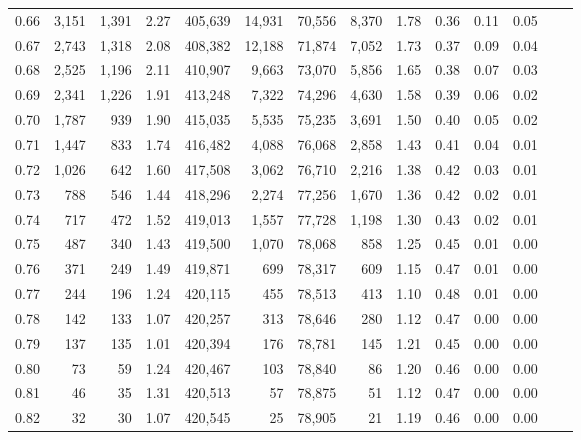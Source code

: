 \begin{tabular}{rrrrrrrrrrrrrr}
0.66 &   3,151 &  1,391 &    2.27 &  405,639 &   14,931 &  70,556 &   8,370 &  1.78 &  0.36 &  0.11 &      0.05 \\
0.67 &   2,743 &  1,318 &    2.08 &  408,382 &   12,188 &  71,874 &   7,052 &  1.73 &  0.37 &  0.09 &      0.04 \\
0.68 &   2,525 &  1,196 &    2.11 &  410,907 &    9,663 &  73,070 &   5,856 &  1.65 &  0.38 &  0.07 &      0.03 \\
0.69 &   2,341 &  1,226 &    1.91 &  413,248 &    7,322 &  74,296 &   4,630 &  1.58 &  0.39 &  0.06 &      0.02 \\
0.70 &   1,787 &    939 &    1.90 &  415,035 &    5,535 &  75,235 &   3,691 &  1.50 &  0.40 &  0.05 &      0.02 \\
0.71 &   1,447 &    833 &    1.74 &  416,482 &    4,088 &  76,068 &   2,858 &  1.43 &  0.41 &  0.04 &      0.01 \\
0.72 &   1,026 &    642 &    1.60 &  417,508 &    3,062 &  76,710 &   2,216 &  1.38 &  0.42 &  0.03 &      0.01 \\
0.73 &     788 &    546 &    1.44 &  418,296 &    2,274 &  77,256 &   1,670 &  1.36 &  0.42 &  0.02 &      0.01 \\
0.74 &     717 &    472 &    1.52 &  419,013 &    1,557 &  77,728 &   1,198 &  1.30 &  0.43 &  0.02 &      0.01 \\
0.75 &     487 &    340 &    1.43 &  419,500 &    1,070 &  78,068 &     858 &  1.25 &  0.45 &  0.01 &      0.00 \\
0.76 &     371 &    249 &    1.49 &  419,871 &      699 &  78,317 &     609 &  1.15 &  0.47 &  0.01 &      0.00 \\
0.77 &     244 &    196 &    1.24 &  420,115 &      455 &  78,513 &     413 &  1.10 &  0.48 &  0.01 &      0.00 \\
0.78 &     142 &    133 &    1.07 &  420,257 &      313 &  78,646 &     280 &  1.12 &  0.47 &  0.00 &      0.00 \\
0.79 &     137 &    135 &    1.01 &  420,394 &      176 &  78,781 &     145 &  1.21 &  0.45 &  0.00 &      0.00 \\
0.80 &      73 &     59 &    1.24 &  420,467 &      103 &  78,840 &      86 &  1.20 &  0.46 &  0.00 &      0.00 \\
0.81 &      46 &     35 &    1.31 &  420,513 &       57 &  78,875 &      51 &  1.12 &  0.47 &  0.00 &      0.00 \\
0.82 &      32 &     30 &    1.07 &  420,545 &       25 &  78,905 &      21 &  1.19 &  0.46 &  0.00 &      0.00 \\

\end{tabular}
